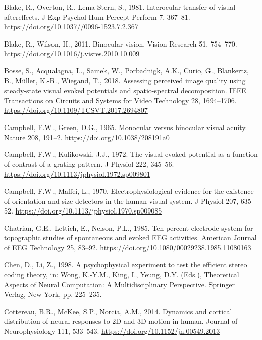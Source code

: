 \documentclass[review,
  12pt,
]{elsarticle}
\newlength{\cslhangindent}
\newenvironment{CSLReferences}[2] %
 {\begin{list}{}{%
  \setlength{\itemindent}{0pt}
  \setlength{\leftmargin}{0pt}
  \setlength{\parsep}{0pt}
  \ifodd #1
   \setlength{\leftmargin}{\cslhangindent}
   \setlength{\itemindent}{-1\cslhangindent}
  \fi
  \setlength{\itemsep}{#2\baselineskip}}}
 {\end{list}}
\begin{document}
\begin{CSLReferences}{1}{0}
Blake, R., Overton, R., Lema-Stern, S., 1981. Interocular transfer of
visual aftereffects. J Exp Psychol Hum Percept Perform 7, 367--81.
\url{https://doi.org/10.1037//0096-1523.7.2.367}

Blake, R., Wilson, H., 2011. Binocular vision. Vision Research 51,
754--770. \url{https://doi.org/10.1016/j.visres.2010.10.009}

Bosse, S., Acqualagna, L., Samek, W., Porbadnigk, A.K., Curio, G.,
Blankertz, B., Müller, K.-R., Wiegand, T., 2018. Assessing perceived
image quality using steady-state visual evoked potentials and
spatio-spectral decomposition. IEEE Transactions on Circuits and Systems
for Video Technology 28, 1694--1706.
\url{https://doi.org/10.1109/TCSVT.2017.2694807}

Campbell, F.W., Green, D.G., 1965. Monocular versus binocular visual
acuity. Nature 208, 191--2. \url{https://doi.org/10.1038/208191a0}

Campbell, F.W., Kulikowski, J.J., 1972. The visual evoked potential as a
function of contrast of a grating pattern. J Physiol 222, 345--56.
\url{https://doi.org/10.1113/jphysiol.1972.sp009801}

Campbell, F.W., Maffei, L., 1970. Electrophysiological evidence for the
existence of orientation and size detectors in the human visual system.
J Physiol 207, 635--52.
\url{https://doi.org/10.1113/jphysiol.1970.sp009085}

Chatrian, G.E., Lettich, E., Nelson, P.L., 1985. Ten percent electrode
system for topographic studies of spontaneous and evoked EEG activities.
American Journal of EEG Technology 25, 83--92.
\url{https://doi.org/10.1080/00029238.1985.11080163}

Chen, D., Li, Z., 1998. A psychophysical experiment to test the
efficient stereo coding theory, in: Wong, K.-Y.M., King, I., Yeung, D.Y.
(Eds.), Theoretical Aspects of Neural Computation: A Multidisciplinary
Perspective. Springer Verlag, New York, pp. 225--235.

Cottereau, B.R., McKee, S.P., Norcia, A.M., 2014. Dynamics and cortical
distribution of neural responses to 2D and 3D motion in human. Journal
of Neurophysiology 111, 533--543.
\url{https://doi.org/10.1152/jn.00549.2013}


\end{CSLReferences}
\end{document}
